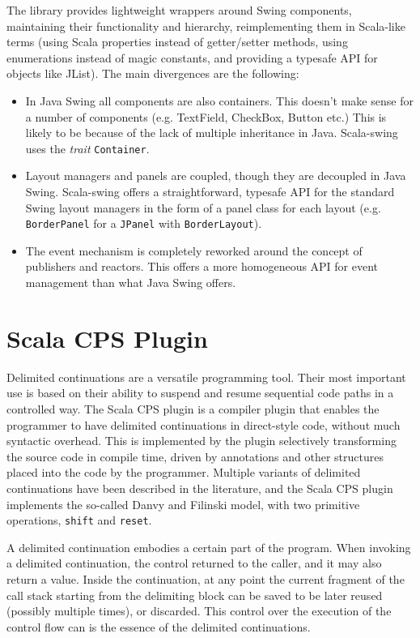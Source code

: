 The library provides lightweight wrappers around Swing components, maintaining their functionality and hierarchy, reimplementing them in Scala-like terms (using Scala properties instead of getter/setter methods, using enumerations instead of magic constants, and providing a typesafe API for objects like JList). The main divergences are the following:
\begin{itemize}
\item In Java Swing all components are also containers. This doesn't make sense for a number of components (e.g. TextField, CheckBox, Button etc.) This is likely to be because of the lack of multiple inheritance in Java. Scala-swing uses the \emph{trait} \texttt{Container}.

\item Layout managers and panels are coupled, though they are decoupled in Java Swing. Scala-swing offers a straightforward, typesafe API for the standard Swing layout managers in the form of a panel class for each layout (e.g. \texttt{BorderPanel} for a \texttt{JPanel} with \texttt{BorderLayout}).

\item The event mechanism is completely reworked around the concept of publishers and reactors. This offers a more homogeneous API for event management than what Java Swing offers.
\end{itemize}

\section{Scala CPS Plugin}

Delimited continuations are a versatile programming tool. Their most important use is based on their ability to suspend and resume sequential code paths in a controlled way. The Scala CPS plugin is a compiler plugin that enables the programmer to have delimited continuations in direct-style code, without much syntactic overhead. This is implemented by the plugin selectively transforming the source code in compile time, driven by annotations and other structures placed into the code by the programmer. Multiple variants of delimited continuations have been described in the literature, and the Scala CPS plugin implements the so-called Danvy and Filinski model, with two primitive operations, \texttt{shift} and \texttt{reset}.

A delimited continuation embodies a certain part of the program. When invoking a delimited continuation, the control returned to the caller, and it may also return a value. Inside the continuation, at any point the current fragment of the call stack starting from the delimiting block can be saved to be later reused (possibly multiple times), or discarded. This control over the execution of the control flow can is the essence of the delimited continuations.

